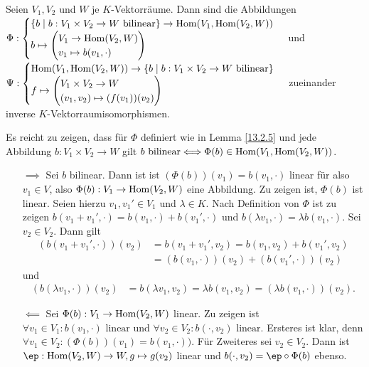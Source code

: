 \documentclass[../../main.tex]{subfiles}
\begin{document}
\begin{sat}\label{13.2.6}
Seien $V_1,V_2$ und $W$ je $K$-Vektorräume. Dann sind die Abbildungen\\ $\Phi: \begin{cases}\{b\mid b: V_1\times V_2\to W\text{ bilinear}\}\to\Hom(V_1,\Hom(V_2,W))\\
b\mapsto\begin{pmatrix*}[l]V_1\to \Hom(V_2,W)\\ v_1\mapsto b(v_1,\cdot)\end{pmatrix*}\end{cases}$ und\\
$\Psi: \begin{cases}\Hom(V_1,\Hom(V_2,W))\to \{b\mid b: V_1\times V_2\to W\text{ bilinear}\}\\
f\mapsto\begin{pmatrix*}[l]V_1\times V_2\to W\\ (v_1,v_2)\mapsto (f(v_1))(v_2)\end{pmatrix*}\end{cases}$ zueinander inverse $K$-Vektorraumisomorphismen.
\end{sat}
\begin{cproof}
Es reicht zu zeigen, dass für $\Phi$ definiert wie in Lemma \ref{13.2.5} und jede Abbildung $b: V_1\times V_2\to W$ gilt $b\text{ bilinear}\Longleftrightarrow\Phi(b)\in \operatorname{Hom}(V_1,\operatorname{Hom}(V_2,W))$.
\begin{itemize}
\item[$\implies$] Sei $b$ bilinear. Dann ist ist $(\Phi(b))(v_1)=b(v_1,\cdot)$ linear für also $v_1\in V$, also $\Phi(b): V_1\to \operatorname{Hom}(V_2,W)$ eine Abbildung. Zu zeigen ist, $\Phi(b)$ ist linear. Seien hierzu $v_1,v_1'\in V_1$ und $\lambda\in K$. Nach Definition von $\Phi$ ist zu zeigen $b(v_1+v_1',\cdot)=b(v_1,\cdot)+b(v_1',\cdot)$ und $b(\lambda v_1,\cdot)=\lambda b(v_1,\cdot)$. Sei $v_2\in V_2$. Dann gilt
\begin{align*}
(b(v_1+v_1',\cdot))(v_2)&=b(v_1+v_1',v_2)=b(v_1,v_2)+b(v_1',v_2)\\&=(b(v_1,\cdot))(v_2)+(b(v_1',\cdot))(v_2)
\end{align*}
und
\begin{align*}
(b(\lambda v_1,\cdot))(v_2)&=b(\lambda v_1,v_2)=\lambda b(v_1,v_2)=(\lambda b(v_1,\cdot))(v_2).
\end{align*}
\item[$\impliedby$] Sei $\Phi(b): V_1\to \operatorname{Hom}(V_2,W)$ linear. Zu zeigen ist $\forall v_1\in V_1: b(v_1,\cdot)\text{ linear}$ und $\forall v_2\in V_2: b(\cdot, v_2)\text{ linear}$. Ersteres ist klar, denn $\forall v_1\in V_2: (\Phi(b))(v_1)=b(v_1,\cdot))$. Für Zweiteres sei $v_2\in V_2$. Dann ist $\ep: \Hom(V_2,W)\to W, g\mapsto g(v_2)$ linear und $b(\cdot,v_2)=\ep\circ \Phi(b)$ ebenso.
\end{itemize}
\end{cproof}
\end{document}
